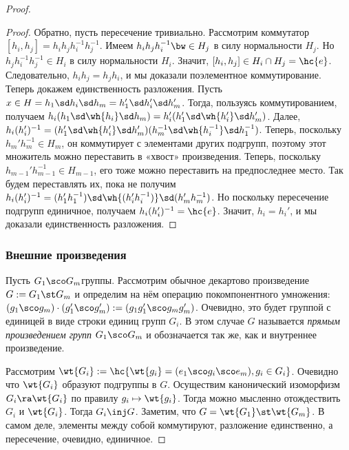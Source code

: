 \documentclass[a4paper]{article}
\begin{document}
\begin{proof}
\begin{proof}
Обратно, пусть пересечение тривиально. Рассмотрим коммутатор  $[h_i, h_j]=h_ih_jh_i^{-1}h_j^{-1}$. Имеем
$h_ih_jh_i^{-1} \bw\in H_j$ в силу нормальности $H_j$. Но $h_jh_i^{-1}h_j^{-1} \in H_i$ в силу нормальности
$H_i$. Значит, $[h_i,h_j] \in H_i \cap H_j = \hc{e}$. Следовательно, $h_ih_j=h_jh_i$, и мы доказали
поэлементное коммутирование. Теперь докажем единственность разложения. Пусть $x \in H = h_1\sd h_i\sd
h_m=h_1'\sd h_i'\sd h_m'$. Тогда, пользуясь коммутированием, получаем $h_i(h_1\sd \wh{h_i}\sd
h_m)=h_i'(h_1'\sd \wh{h_i'}\sd h_m')$. Далее, $h_i(h_i')^{-1}=(h_1'\sd \wh{h_i'}\sd h_m')(h_m^{-1}\sd
\wh{h_i^{-1}}\sd h_1^{-1})$. Теперь, поскольку $h_m'h_m^{-1} \in H_m$, он коммутирует с элементами других
подгрупп, поэтому этот множитель можно переставить в «хвост» произведения. Теперь, поскольку
$h_{m-1}'h_{m-1}^{-1} \in H_{m-1}$, его тоже можно переставить на предпоследнее место. Так будем переставлять
их, пока не получим $h_i(h_i')^{-1}=(h_1'h_1^{-1})\sd \wh{(h_i'h_i^{-1})}\sd (h_m'h_m^{-1})$. Но поскольку
пересечение подгрупп единичное, получаем $h_i(h_i')^{-1}=\hc{e}$. Значит, $h_i=h_i'$, и мы доказали
единственность разложения.
\end{proof}

\subsubsection{Внешние произведения}

\begin{df}
Пусть $G_1\sco G_m$\т группы. Рассмотрим обычное декартово произведение $G := G_1\st G_m$ и определим на нём
операцию покомпонентного умножения:  $(g_1\sco g_m)\cdot(g_1'\sco g_m'):=(g_1g_1'\sco g_mg_m')$. Очевидно,
это будет группой с единицей в виде строки единиц групп $G_i$. В этом случае $G$ называется \emph{прямым
произведением групп} $G_1\sco G_m$ и обозначается так же, как и внутреннее произведение.
\end{df}

Рассмотрим $\wt{G_i} := \hc{\wt{g_i}=(e_1\sco g_i\sco e_m), g_i \in G_i}$.  Очевидно что $\wt{G_i}$ образуют
подгруппы в $G$. Осуществим канонический изоморфизм $G_i \ra \wt{G_i}$ по правилу $g_i \mapsto \wt{g_i}$.
Тогда можно мысленно отождествить $G_i$ и $\wt{G_i}$. Тогда $G_i \inj G$. Заметим, что $G=\wt{G_1}\st
\wt{G_m}$. В самом деле, элементы между собой коммутируют, разложение единственно, а пересечение, очевидно,
единичное.


\end{proof}
\end{document}
